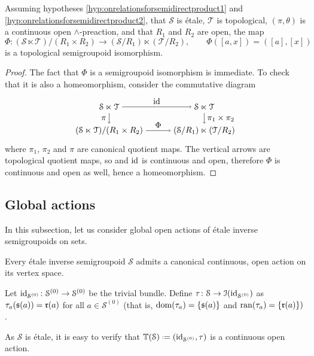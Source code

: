 \begin{theorem}
Assuming hypotheses \ref{hyp:onrelationsforsemidirectproduct1} and \ref{hyp:onrelationsforsemidirectproduct2}, that $\mathcal{S}$ is étale, $\mathcal{T}$ is topological, $(\pi,\theta)$ is a continuous open $\land$-preaction, and that $R_1$ and $R_2$ are open, the map
\[\Phi\colon(\mathcal{S}\ltimes\mathcal{T})/(R_1\times R_2)\to(\mathcal{S}/R_1)\ltimes(\mathcal{T}/R_2),\qquad\Phi([a,x])=([a],[x])\]
is a topological semigroupoid isomorphism.
\end{theorem}
\begin{proof}
    The fact that $\Phi$ is a semigroupoid isomorphism is immediate. To check that it is also a homeomorphism, consider the commutative diagram
    \[\begin{tikzpicture}
        \node (1ST) at (0,0) {$\mathcal{S}\ltimes\mathcal{T}$};
        \node (SRTR) at ([shift={+(0,-1)}]1ST) {$(\mathcal{S}/R_1)\ltimes(\mathcal{T}/R_2)$};
        \node (2ST) at ([shift={+(-4,0)}]1ST) {$\mathcal{S}\ltimes\mathcal{T}$};
        \node (STRR) at ([shift={+(0,-1)}]2ST) {$(\mathcal{S}\ltimes\mathcal{T})/(R_1\times R_2)$};
        \draw[->] (2ST)--(1ST) node[midway,above] {$\id$};
        \draw[->] (1ST)--(SRTR) node[midway,right] {$\pi_1\times\pi_2$};
        \draw[->] (2ST)--(STRR) node[midway,left] {$\pi$};
        \draw[->] (STRR)--(SRTR) node[midway,above] {$\Phi$};
    \end{tikzpicture}\]
    where $\pi_1$, $\pi_2$ and $\pi$ are canonical quotient maps. The vertical arrows are topological quotient maps, so and $\operatorname{id}$ is continuous and open, therefore $\Phi$ is continuous and open as well, hence a homeomorphism.\qedhere
\end{proof}

\subsection{Global actions}

In this subsection, let us consider global open actions of étale inverse semigroupoids on sets.

\begin{example}\label{ex:actiononvertexspace}
Every étale inverse semigroupoid $\mathcal{S}$ admits a canonical continuous, open action on its vertex space.

Let $\operatorname{id}_{\mathcal{S}^{(0)}}\colon\mathcal{S}^{(0)}\to\mathcal{S}^{(0)}$ be the trivial bundle. Define  $\tau\colon\mathcal{S}\to\mathcal{I}(\operatorname{id}_{\mathcal{S}^{(0)}})$ as $\tau_a(\operatorname{\mathfrak{s}}(a))=\operatorname{\mathfrak{r}}(a)$ for all $a\in\mathcal{S}^{(0)}$ (that is, $\operatorname{dom}(\tau_a)=\left\{\operatorname{\mathfrak{s}}(a)\right\}$ and $\operatorname{ran}(\tau_a)=\left\{\operatorname{\mathfrak{r}}(a)\right\})$.

As $\mathcal{S}$ is étale, it is easy to verify that $\mathbb{T}(\mathcal{S})\defeq(\id_{\mathcal{S}^{(0)}},\tau)$ is a continuous open action.
\end{example}

